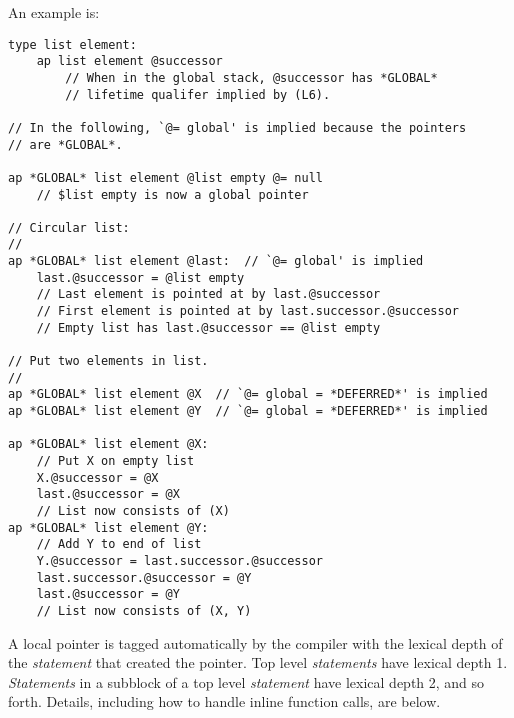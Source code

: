 \documentclass[12pt]{article}
\newenvironment{indpar}[1][0.3in]%
	{\begin{list}{}%
		     {\setlength{\itemsep}{0in}%
		      \setlength{\topsep}{0in}%
		      \setlength{\parsep}{1ex}%
		      \setlength{\labelwidth}{#1}%
		      \setlength{\leftmargin}{#1}%
		      \addtolength{\leftmargin}{\labelsep}}%
	 \item}%
	{\end{list}}
\begin{document}
An example is:
\begin{indpar}\begin{verbatim}
type list element:
    ap list element @successor
        // When in the global stack, @successor has *GLOBAL*
        // lifetime qualifer implied by (L6).

// In the following, `@= global' is implied because the pointers
// are *GLOBAL*.

ap *GLOBAL* list element @list empty @= null
    // $list empty is now a global pointer

// Circular list:
//
ap *GLOBAL* list element @last:  // `@= global' is implied
    last.@successor = @list empty
    // Last element is pointed at by last.@successor
    // First element is pointed at by last.successor.@successor
    // Empty list has last.@successor == @list empty

// Put two elements in list.
//
ap *GLOBAL* list element @X  // `@= global = *DEFERRED*' is implied
ap *GLOBAL* list element @Y  // `@= global = *DEFERRED*' is implied

ap *GLOBAL* list element @X:
    // Put X on empty list
    X.@successor = @X
    last.@successor = @X
    // List now consists of (X)
ap *GLOBAL* list element @Y:
    // Add Y to end of list
    Y.@successor = last.successor.@successor
    last.successor.@successor = @Y
    last.@successor = @Y
    // List now consists of (X, Y)
\end{verbatim}\end{indpar}

A local pointer is tagged automatically by the compiler with the
lexical depth of the {\em statement} that created the pointer.  Top level
{\em statements} have lexical depth 1.  {\em Statements} in a subblock
of a top level {\em statement} have lexical depth 2, and so forth.
Details, including how to handle inline function calls, are below.
\end{document}
